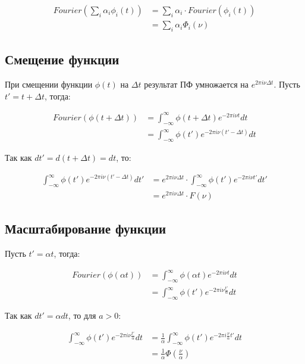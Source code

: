 \documentclass[a4paper,12pt]{report}
\begin{document}
\[
    \begin{aligned}
        Fourier\left(\sum_{i}\alpha_i\phi_i(t)\right)
        &= \sum_{i}\alpha_i \cdot Fourier(\phi_i(t)) \\
        &= \sum_{i}\alpha_i \Phi_i(\nu)
    \end{aligned}
\]

\subsection{Смещение функции}

При смещении функции $\phi(t)$ на $\Delta t$ результат ПФ умножается на $e^{2\pi i \nu\Delta t}$. Пусть $t' = t + \Delta t$, тогда:

\[
    \begin{aligned}
        Fourier\left(\phi(t + \Delta t)\right)
        &= \int_{-\infty}^{\infty} \phi(t + \Delta t) e^{-2\pi i\nu t} dt \\
        &= \int_{-\infty}^{\infty} \phi(t') e^{-2\pi i\nu (t' - \Delta t)} dt
    \end{aligned}
\]

Так как $dt' = d(t + \Delta t) = dt$, то:

\[
    \begin{aligned}
        \int_{-\infty}^{\infty} \phi(t') e^{-2\pi i\nu (t' - \Delta t)} dt'
        &= e^{2\pi i\nu\Delta t} \cdot \int_{-\infty}^{\infty} \phi(t') e^{-2\pi i\nu t'} dt' \\
        &= e^{2\pi i\nu\Delta t} \cdot F(\nu)
    \end{aligned}
\]

\subsection{Масштабирование функции}

Пусть $t' = \alpha t$, тогда:

\[
    \begin{aligned}
        Fourier\left(\phi(\alpha t)\right)
        &= \int_{-\infty}^{\infty} \phi(\alpha t) e^{-2\pi i\nu t} dt \\
        &= \int_{-\infty}^{\infty} \phi(t') e^{-2\pi i\nu \frac{t'}{\alpha}} dt
    \end{aligned}
\]

Так как $dt' = \alpha dt$, то для $a > 0$:

\[
    \begin{aligned}
        \int_{-\infty}^{\infty} \phi(t') e^{-2\pi i\nu \frac{t'}{\alpha}} dt
        &= \frac{1}{\alpha} \int_{-\infty}^{\infty} \phi(t') e^{-2\pi i\frac{\nu}{\alpha} t'} dt \\
        &= \frac{1}{\alpha} \Phi\left(\frac{\nu}{\alpha}\right)
    \end{aligned}
\]
\end{document}
